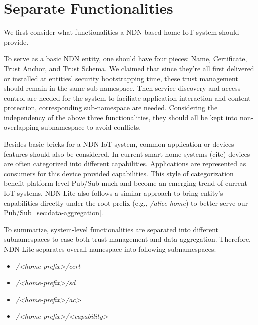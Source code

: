 \section{Separate Functionalities}
\label{sec:separation}

We first consider what functionalities a NDN-based home IoT system should provide. 

To serve as a basic NDN entity, one should have four pieces: Name, Certificate, Trust Anchor, and Trust Schema.
We claimed that since they're all first delivered or installed at entities' security bootstrapping time, these trust management should remain in the same sub-namespace.
Then service discovery and access control are needed for the system to faciliate application interaction and content protection, corresponding sub-namespace are needed. 
Considering the independency of the above three functionalities, they should all be kept into non-overlapping subnamespace to avoid conflicts.

Besides basic bricks for a NDN IoT system, common application or devices features should also be considered.
In current smart home systems (cite) devices are often categorized into different capabilities. Applications are represented as consumers for this device provided capabilities.
This style of categorization benefit platform-level Pub/Sub much and become an emerging trend of current IoT systems.
NDN-Lite also follows a similar approach to bring entity's capabilities directly under the root prefix (e.g., \textsl{/alice-home}) to better serve our Pub/Sub~\ref{sec:data-aggregation}.

To summarize, system-level functionalities are separated into different subnamespaces to ease both trust management and data aggregation.
Therefore, NDN-Lite separates overall namespace into following subnamespaces:

\begin{itemize}
\setlength{\itemsep}{0pt}
    \item \textsl{/<home-prefix>/cert}
    \item \textsl{/<home-prefix>/sd}
    \item \textsl{/<home-prefix>/ac>}
    \item \textsl{/<home-prefix>/<capability>}
\end{itemize}